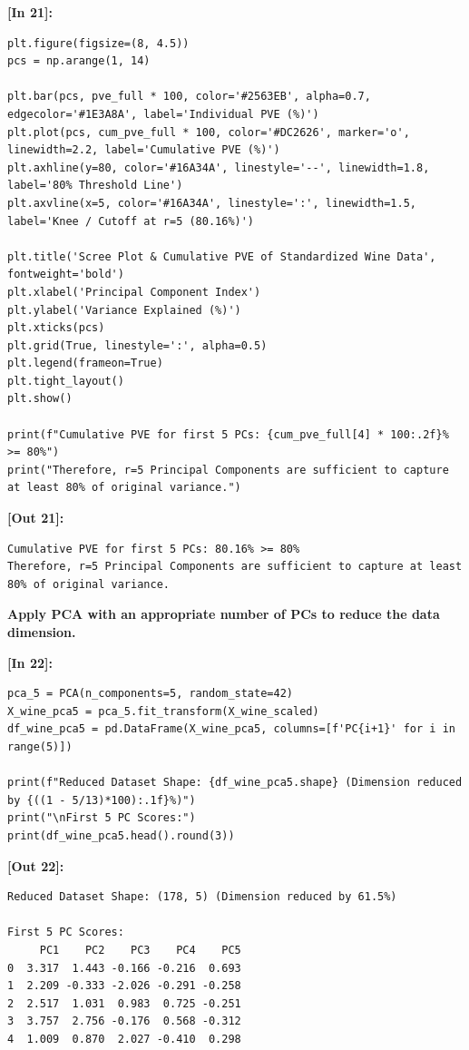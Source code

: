 \vspace{0.4em}
\noindent\textbf{\small [In 21]:}
\begin{lstlisting}[style=pycode]
plt.figure(figsize=(8, 4.5))
pcs = np.arange(1, 14)

plt.bar(pcs, pve_full * 100, color='#2563EB', alpha=0.7, edgecolor='#1E3A8A', label='Individual PVE (%)')
plt.plot(pcs, cum_pve_full * 100, color='#DC2626', marker='o', linewidth=2.2, label='Cumulative PVE (%)')
plt.axhline(y=80, color='#16A34A', linestyle='--', linewidth=1.8, label='80% Threshold Line')
plt.axvline(x=5, color='#16A34A', linestyle=':', linewidth=1.5, label='Knee / Cutoff at r=5 (80.16%)')

plt.title('Scree Plot & Cumulative PVE of Standardized Wine Data', fontweight='bold')
plt.xlabel('Principal Component Index')
plt.ylabel('Variance Explained (%)')
plt.xticks(pcs)
plt.grid(True, linestyle=':', alpha=0.5)
plt.legend(frameon=True)
plt.tight_layout()
plt.show()

print(f"Cumulative PVE for first 5 PCs: {cum_pve_full[4] * 100:.2f}% >= 80%")
print("Therefore, r=5 Principal Components are sufficient to capture at least 80% of original variance.")
\end{lstlisting}
\noindent\textbf{\small [Out 21]:}
\begin{lstlisting}[style=output]
Cumulative PVE for first 5 PCs: 80.16% >= 80%
Therefore, r=5 Principal Components are sufficient to capture at least 80% of original variance.
\end{lstlisting}

\vspace{0.3em}
\begin{tcolorbox}[colback=gray!5!white,colframe=gray!50!black,boxrule=0.5pt,arc=2pt,left=4pt,right=4pt,top=2pt,bottom=2pt,unbreakable,before upper={\sloppy\raggedright}]
{\small\bfseries Apply PCA with an appropriate number of PCs to reduce the data dimension.\par}
\end{tcolorbox}

\vspace{0.4em}
\noindent\textbf{\small [In 22]:}
\begin{lstlisting}[style=pycode]
pca_5 = PCA(n_components=5, random_state=42)
X_wine_pca5 = pca_5.fit_transform(X_wine_scaled)
df_wine_pca5 = pd.DataFrame(X_wine_pca5, columns=[f'PC{i+1}' for i in range(5)])

print(f"Reduced Dataset Shape: {df_wine_pca5.shape} (Dimension reduced by {((1 - 5/13)*100):.1f}%)")
print("\nFirst 5 PC Scores:")
print(df_wine_pca5.head().round(3))
\end{lstlisting}
\noindent\textbf{\small [Out 22]:}
\begin{lstlisting}[style=output]
Reduced Dataset Shape: (178, 5) (Dimension reduced by 61.5%)

First 5 PC Scores:
     PC1    PC2    PC3    PC4    PC5
0  3.317  1.443 -0.166 -0.216  0.693
1  2.209 -0.333 -2.026 -0.291 -0.258
2  2.517  1.031  0.983  0.725 -0.251
3  3.757  2.756 -0.176  0.568 -0.312
4  1.009  0.870  2.027 -0.410  0.298
\end{lstlisting}

